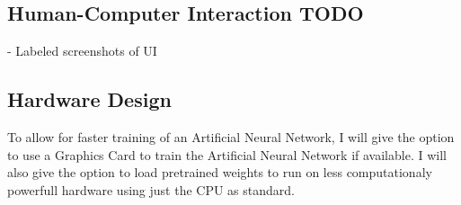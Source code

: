 \documentclass[./project-report/src/latex/project-report.tex]{subfiles}
\begin{document}
\subsection{Human-Computer Interaction TODO}

- Labeled screenshots of UI

\subsection{Hardware Design}

To allow for faster training of an Artificial Neural Network, I will give the option to use a Graphics Card to train the Artificial Neural Network if available. 
I will also give the option to load pretrained weights to run on less computationaly powerfull hardware using just the CPU as standard.
\end{document}
